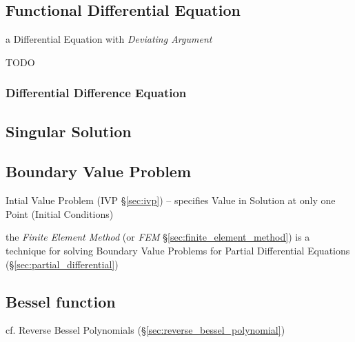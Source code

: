 \subsection{Functional Differential Equation}\label{sec:fde}

a Differential Equation with \emph{Deviating Argument}

TODO



\subsubsection{Differential Difference Equation}\label{sec:dde}



\subsection{Singular Solution}\label{sec:singular_solution}

\subsection{Boundary Value Problem}\label{sec:boundary_value_problem}


\fist Intial Value Problem (IVP \S\ref{sec:ivp}) -- specifies Value in Solution
at only one Point (Initial Conditions)


\fist the \emph{Finite Element Method} (or \emph{FEM}
\S\ref{sec:finite_element_method}) is a technique for solving Boundary Value
Problems for Partial Differential Equations (\S\ref{sec:partial_differential})



\subsection{Bessel function}\label{sec:bessel_function}

cf. Reverse Bessel Polynomials (\S\ref{sec:reverse_bessel_polynomial})



